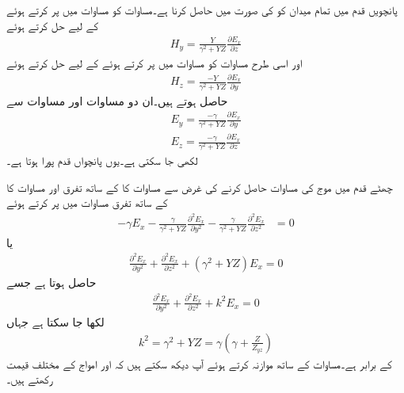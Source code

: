 پانچویں قدم میں تمام میدان کو  کی صورت میں حاصل کرنا ہے۔مساوات  کو مساوات  میں پر کرتے ہوئے   کے لیے حل کرتے ہوئے
\begin{align}
H_y=\frac{Y}{\gamma^2+YZ} \frac{\partial E_x}{\partial z}\label{مساوات_مویج_عرضی_مقناطیسی_برقی_شکل_الف}
\end{align}
اور اسی طرح مساوات  کو مساوات  میں پر کرتے ہوئے   کے لیے حل کرتے ہوئے
\begin{align}
H_z=\frac{-Y}{\gamma^2+YZ} \frac{\partial E_x}{\partial y}\label{مساوات_مویج_عرضی_مقناطیسی_برقی_شکل_ب}
\end{align}
حاصل ہوتے ہیں۔ان دو مساوات اور مساوات  سے 
\begin{align}
E_y=\frac{-\gamma}{\gamma^2+YZ} \frac{\partial E_x}{\partial y} \label{مساوات_مویج_عرضی_مقناطیسی_برقی_شکل_پ}\\
E_z=\frac{-\gamma}{\gamma^2+YZ} \frac{\partial E_x}{\partial z}\label{مساوات_مویج_عرضی_مقناطیسی_برقی_شکل_ت}
\end{align}
لکھی جا سکتی ہے۔یوں پانچواں قدم پورا ہوتا ہے۔

چھٹے قدم میں   موج کی مساوات حاصل کرنے کی غرض سے مساوات  کا  کے ساتھ تفرق اور مساوات  کا  کے ساتھ تفرق مساوات  میں پر کرتے ہوئے  
\begin{align*}
-\gamma E_x-\frac{\gamma}{\gamma^2+YZ}\frac{\partial^2 E_x}{\partial y^2}-\frac{\gamma}{\gamma^2+YZ}\frac{\partial^2 E_x}{\partial z^2}&=0  
\end{align*}
یا
\begin{align*}
\frac{\partial^2 E_x}{\partial y^2}+\frac{\partial^2 E_x}{\partial z^2}+(\gamma^2+YZ)E_x=0  
\end{align*}
حاصل ہوتا ہے جسے
\begin{align}\label{مساوات_مویج_عرضی_مقناطیسی_غیر_سمتی_موج}
\frac{\partial^2 E_x}{\partial y^2}+\frac{\partial^2 E_x}{\partial z^2}+k^2 E_x=0  
\end{align}
لکھا جا سکتا ہے جہاں
\begin{align}\label{مساوات_مویج_عرضی_مقناطیسی_مستقل_قے_الف}
k^2=\gamma^2+YZ=\gamma\left(\gamma+\frac{Z}{Z_{yz}}\right)
\end{align}
کے برابر ہے۔مساوات  کے ساتھ موازنہ کرتے ہوئے آپ دیکھ سکتے ہیں کہ  اور  امواج کے  مختلف قیمت رکھتے ہیں۔

